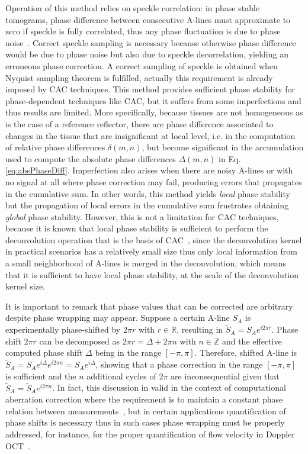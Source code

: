Operation of this method relies on speckle correlation: in phase stable tomograms, phase difference between consecutive A-lines must approximate to zero if speckle is fully correlated, thus any phase fluctuation is due to phase noise~\cite{White2003_vivo}. Correct speckle sampling is necessary because otherwise phase difference would be due to phase noise but also due to speckle decorrelation, yielding an erroneous phase correction. A correct sampling of speckle is obtained when Nyquist sampling theorem is fulfilled, actually this requirement is already imposed by CAC techniques. This method provides sufficient phase stability for phase-dependent techniques like CAC, but it suffers from some imperfections and thus results are limited. More specifically, because tissues are not homogeneous as is the case of a reference reflector, there are phase difference associated to changes in the tissue that are insignificant at local level, i.e. in the computation of relative phase differences $\delta(m,n)$, but become significant in the accumulation used to compute the absolute phase differences $\Delta(m,n)$ in Eq.\eqref{eq:absPhaseDiff}. Imperfection also arises when there are noisy A-lines or with no signal at all where phase correction may fail, producing errors that propagates in the cumulative sum. In other words, this method yields \textit{local} phase stability but the propagation of local errors in the cumulative sum frustrates obtaining \textit{global} phase stability. However, this is not a limitation for CAC techniques, because it is known that local phase stability is sufficient to perform the deconvolution operation that is the basis of CAC~\cite{Shemonski2014_Stability}, since the deconvolution kernel in practical scenarios has a relatively small size thus only local information from a small neighborhood of A-lines is merged in the deconvolution, which means that it is sufficient to have local phase stability, at the scale of the deconvolution kernel size.

It is important to remark that phase values that can be corrected are arbitrary despite phase wrapping may appear. Suppose a certain A-line $S_A$ is experimentally phase-shifted by $2\pi r$ with $r\in\mathbb{R}$, resulting in $\tilde{S}_A=S_Ae^{i2\pi r}$. Phase shift $2\pi r$ can be decomposed as $2\pi r = \Delta + 2\pi n$ with $n\in \mathbb{Z}$ and the effective computed phase shift $\Delta$ being in the range $[-\pi, \pi]$. Therefore, shifted A-line is $\tilde{S}_A=S_Ae^{i\Delta} e^{i2\pi n}=S_A e^{i\Delta}$, showing that a phase correction in the range $[-\pi, \pi]$ is sufficient and the $n$ additional cycles of $2\pi$ are inconsequential given that $\tilde{S}_A = \tilde{S}_Ae^{i2\pi n}$. In fact, this discussion in valid in the context of computational aberration correction where the requirement is to maintain a constant phase relation between measurements~\cite{Shemonski2014_Stability}, but in certain applications quantification of phase shifts is necessary thus in such cases phase wrapping must be properly addressed, for instance, for the proper quantification of flow velocity in Doppler OCT~\cite{Hong2012_Highpenetration}.

